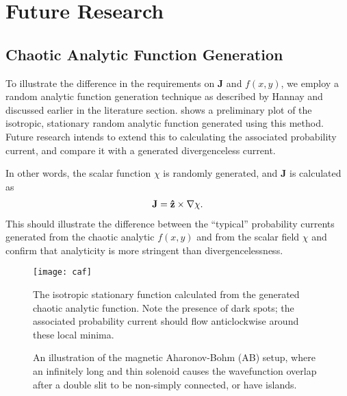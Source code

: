 \section{Future Research}
\label{sec:future}

\subsection{Chaotic Analytic Function Generation}

To illustrate the difference in the requirements on $\mathbf{J}$ and $f(x,y)$,
we employ a random analytic function generation technique as
described by Hannay \cite{hannay} and discussed earlier in the literature
section.  shows a preliminary plot of the isotropic, stationary
random analytic function generated using this method. Future research intends to
extend this to calculating the associated probability current, and compare it
with a generated divergenceless current.

In other words, the scalar function $\chi$ is randomly generated, and
$\mathbf{J}$ is calculated as
\begin{align}
    \mathbf{J} = \mathbf{\hat z } \times \nabla \chi.
\end{align}
This should illustrate the difference between the ``typical'' probability
currents generated from the chaotic analytic $f(x,y)$ and from the scalar field
$\chi$ and confirm that analyticity is more stringent than divergencelessness.

\begin{figure}
    \centering
    \begin{minipage}{0.45\linewidth}
        \centering
        \texttt{[image: caf]}
        \caption{The isotropic stationary function calculated from the generated
            chaotic analytic function. Note the presence of dark spots; the
            associated probability current should flow anticlockwise around these local
            minima.}
        \label{fig:caf}
    \end{minipage}
    \begin{minipage}{0.45\linewidth}
        \centering
        \def\svgwidth{\linewidth}
        
        \caption{An illustration of the magnetic Aharonov-Bohm (AB) setup, where an
            infinitely long and thin solenoid causes the wavefunction overlap after
            a double slit to be non-simply connected, or have islands.}
        \label{fig:magnetic-ab}
    \end{minipage}
\end{figure}

